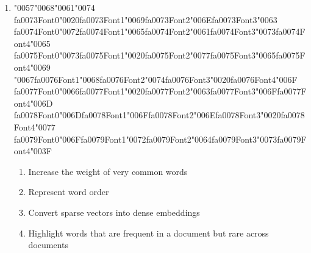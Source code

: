 \documentclass[12pt]{article}
\begin{document}
\begin{enumerate}[label=Q\arabic*.]
\item {\char"0057}{\char"0068}{\char"0061}{\char"0074} {\csname fa0073Font0\endcsname\char"0020}{\csname fa0073Font1\endcsname\char"0069}{\csname fa0073Font2\endcsname\char"006E}{\csname fa0073Font3\endcsname\char"0063} {\csname fa0074Font0\endcsname\char"0072}{\csname fa0074Font1\endcsname\char"0065}{\csname fa0074Font2\endcsname\char"0061}{\csname fa0074Font3\endcsname\char"0073}{\csname fa0074Font4\endcsname\char"0065} {\csname fa0075Font0\endcsname\char"0073}{\csname fa0075Font1\endcsname\char"0020}{\csname fa0075Font2\endcsname\char"0077}{\csname fa0075Font3\endcsname\char"0065}{\csname fa0075Font4\endcsname\char"0069} {\char"0067}{\csname fa0076Font1\endcsname\char"0068}{\csname fa0076Font2\endcsname\char"0074}{\csname fa0076Font3\endcsname\char"0020}{\csname fa0076Font4\endcsname\char"006F} {\csname fa0077Font0\endcsname\char"0066}{\csname fa0077Font1\endcsname\char"0020}{\csname fa0077Font2\endcsname\char"0063}{\csname fa0077Font3\endcsname\char"006F}{\csname fa0077Font4\endcsname\char"006D} {\csname fa0078Font0\endcsname\char"006D}{\csname fa0078Font1\endcsname\char"006F}{\csname fa0078Font2\endcsname\char"006E}{\csname fa0078Font3\endcsname\char"0020}{\csname fa0078Font4\endcsname\char"0077} {\csname fa0079Font0\endcsname\char"006F}{\csname fa0079Font1\endcsname\char"0072}{\csname fa0079Font2\endcsname\char"0064}{\csname fa0079Font3\endcsname\char"0073}{\csname fa0079Font4\endcsname\char"003F}
\begin{enumerate}[label=(\Alph*)]
    \item Increase the weight of very common words
    \item Represent word order
    \item Convert sparse vectors into dense embeddings
    \item Highlight words that are frequent in a document but rare across documents
\end{enumerate}
\newpage %

\end{enumerate}
\end{document}
